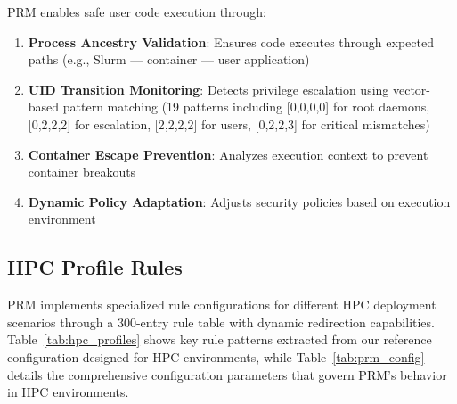 \documentclass[]{sn-jnl}
\begin{document}
PRM enables safe user code execution through:

\begin{enumerate}
\item \textbf{Process Ancestry Validation}: Ensures code executes through
      expected paths (e.g., Slurm --- container --- user application)
\item \textbf{UID Transition Monitoring}: Detects privilege escalation using
      vector-based pattern matching (19 patterns including [0,0,0,0] for root
      daemons, [0,2,2,2] for escalation, [2,2,2,2] for users, [0,2,2,3] for
      critical mismatches)
\item \textbf{Container Escape Prevention}: Analyzes execution context to prevent
      container breakouts
\item \textbf{Dynamic Policy Adaptation}: Adjusts security policies based on
      execution environment
\end{enumerate}

\subsection{HPC Profile Rules}

PRM implements specialized rule configurations for different HPC deployment
scenarios through a 300-entry rule table with dynamic redirection capabilities.
Table~\ref{tab:hpc_profiles} shows key rule patterns extracted from our reference
configuration designed for HPC environments, while Table~\ref{tab:prm_config}
details the comprehensive configuration parameters that govern PRM's behavior in
HPC environments.
\end{document}
